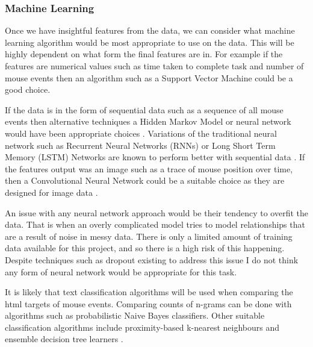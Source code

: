 \documentclass{article}
\begin{document}
\subsubsection{Machine Learning}


Once we have insightful features from the data, we can consider what machine learning algorithm would be most appropriate to use on the data.
This will be highly dependent on what form the final features are in.
For example if the features are numerical values such as time taken to complete task and number of mouse events then an algorithm such as a Support Vector Machine could be a good choice.

If the data is in the form of sequential data such as a sequence of all mouse events then alternative techniques a Hidden Markov Model or neural network would have been appropriate choices \cite{xing2010brief}.
Variations of the traditional neural network such as Recurrent Neural Networks (RNNs) or Long Short Term Memory (LSTM) Networks are known to perform better with sequential data \cite{hochreiter1997long}.
If the features output was an image such as a trace of mouse position over time, then a Convolutional Neural Network could be a suitable choice as they are designed for image data \cite{krizhevsky2012imagenet}.

An issue with any neural network approach would be their tendency to overfit the data.
That is when an overly complicated model tries to model relationships that are a result of noise in messy data.
There is only a limited amount of training data available for this project, and so there is a high risk of this happening.
Despite techniques such as dropout \cite{srivastava2014dropout} existing to address this issue I do not think any form of neural network would be appropriate for this task.


It is likely that text classification algorithms will be used when comparing the html targets of mouse events.
Comparing counts of n-grams can be done with algorithms such as probabilistic Naive Bayes classifiers.
Other suitable classification algorithms include proximity-based k-nearest neighbours and ensemble decision tree learners \cite{aggarwal2012survey}.
\end{document}
